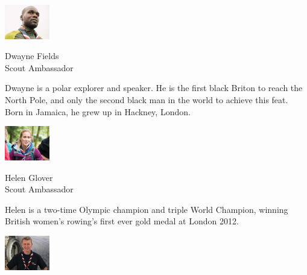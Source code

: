 \begin{frame}
\hfill%
\begin{minipage}[t]{0.95\textwidth}
\raggedright
\vspace*{3mm}
\setlength{\columnsep}{2mm}
\begin{multicols}{4}
\Tiny
\includegraphics[height=1.5cm]{media/image10}
\par
\vspace{1.4mm}
\linespread{1.2}\selectfont Dwayne Fields\\Scout Ambassador
\par
\vspace{1.2\baselineskip}
\begin{minipage}[t]{\columnwidth}
\linespread{1.4}\selectfont
\raggedright
Dwayne is a polar explorer
and speaker. He is the first
black Briton to reach the
North Pole, and only the
second black man in the
world to achieve this feat.
Born in Jamaica, he grew up
in Hackney, London.
\end{minipage}
\vfill
\columnbreak
\includegraphics[height=1.5cm]{media/image11}
\par
\vspace{1.4mm}
\linespread{1.2}\selectfont Helen Glover\\Scout Ambassador
\par
\vspace{1.2\baselineskip}
\begin{minipage}[t]{\columnwidth}
\linespread{1.4}\selectfont
\raggedright
Helen is a two-time Olympic
champion and triple World
Champion, winning British
women’s rowing’s first ever
gold medal at London 2012.
\end{minipage}
\vfill
\columnbreak
\includegraphics[height=1.5cm]{media/image9}

\end{multicols}
\end{minipage}
\end{frame}
